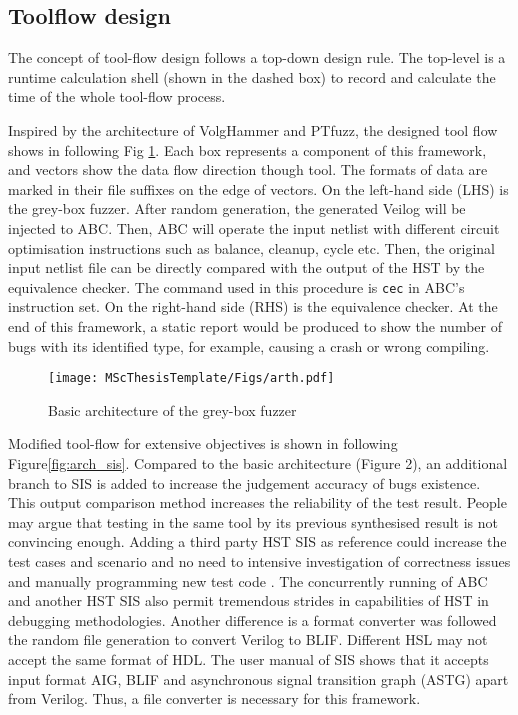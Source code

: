 \subsection{Toolflow design}
The concept of tool-flow design follows a top-down design rule. The top-level is a runtime calculation shell (shown in the dashed box) to record and calculate the time of the whole tool-flow process. 

Inspired by the architecture of VolgHammer \cite{clifford} and PTfuzz\cite{zhang2018ptfuzz}, the designed tool flow shows in following Fig \ref{fig:arch}. Each box represents a component of this framework, and vectors show the data flow direction though tool. The formats of data are marked in their file suffixes on the edge of vectors. On the left-hand side (LHS) is the grey-box fuzzer. After random generation, the generated Veilog will be injected to ABC. Then, ABC will operate the input netlist with different circuit optimisation instructions such as balance, cleanup, cycle etc. Then, the original input netlist file can be directly compared with the output of the HST by the equivalence checker. The command used in this procedure is \texttt{cec} in ABC's instruction set. On the right-hand side (RHS) is the equivalence checker. At the end of this framework, a static report would be produced to show the number of bugs with its identified type, for example, causing a crash or wrong compiling.  

\begin{figure}[htbp]
    \centering
    \texttt{[image: MScThesisTemplate/Figs/arth.pdf]}
    \caption{\footnotesize Basic architecture of the grey-box fuzzer}
    \label{fig:arch}
\end{figure}

Modified tool-flow for extensive objectives is shown in following Figure\ref{fig:arch_sis}. Compared to the basic architecture (Figure 2), an additional branch to SIS is added to increase the judgement accuracy of bugs existence. This output comparison method increases the reliability of the test result. People may argue that testing in the same tool by its previous synthesised result is not convincing enough. Adding a third party HST SIS as reference could increase the test cases and scenario and no need to intensive investigation of correctness issues and manually programming new test code \cite{sheridan2007practical}. The concurrently running of ABC and another HST SIS also permit tremendous strides in capabilities of HST in debugging methodologies. Another difference is a format converter was followed the random file generation to convert Verilog to BLIF. Different HSL may not accept the same format of HDL. The user manual of SIS \cite{SIS} shows that it accepts input format AIG, BLIF and asynchronous signal transition graph (ASTG) apart from Verilog. Thus, a file converter is necessary for this framework.

